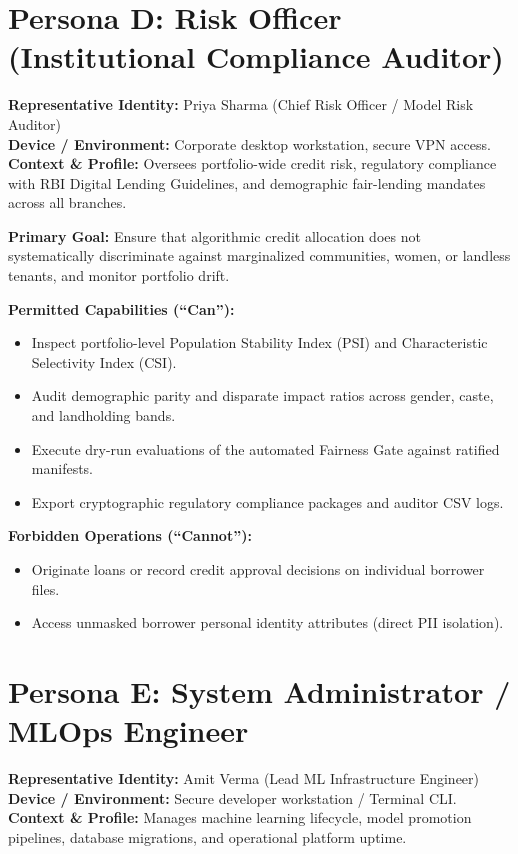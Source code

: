 \documentclass[11pt,a4paper,oneside]{report}
\begin{document}
\section{Persona D: Risk Officer (Institutional Compliance Auditor)}
\noindent\textbf{Representative Identity:} Priya Sharma (Chief Risk Officer / Model Risk Auditor)\\
\textbf{Device / Environment:} Corporate desktop workstation, secure VPN access.\\
\textbf{Context \& Profile:} Oversees portfolio-wide credit risk, regulatory compliance with RBI Digital Lending Guidelines, and demographic fair-lending mandates across all branches.

\vspace{0.2cm}
\noindent\textbf{Primary Goal:} Ensure that algorithmic credit allocation does not systematically discriminate against marginalized communities, women, or landless tenants, and monitor portfolio drift.

\vspace{0.2cm}
\noindent\textbf{Permitted Capabilities (``Can''):}
\begin{itemize}[leftmargin=1.5em, itemsep=1pt]
  \item Inspect portfolio-level Population Stability Index (PSI) and Characteristic Selectivity Index (CSI).
  \item Audit demographic parity and disparate impact ratios across gender, caste, and landholding bands.
  \item Execute dry-run evaluations of the automated Fairness Gate against ratified manifests.
  \item Export cryptographic regulatory compliance packages and auditor CSV logs.
\end{itemize}

\noindent\textbf{Forbidden Operations (``Cannot''):}
\begin{itemize}[leftmargin=1.5em, itemsep=1pt]
  \item Originate loans or record credit approval decisions on individual borrower files.
  \item Access unmasked borrower personal identity attributes (direct PII isolation).
\end{itemize}

\section{Persona E: System Administrator / MLOps Engineer}
\noindent\textbf{Representative Identity:} Amit Verma (Lead ML Infrastructure Engineer)\\
\textbf{Device / Environment:} Secure developer workstation / Terminal CLI.\\
\textbf{Context \& Profile:} Manages machine learning lifecycle, model promotion pipelines, database migrations, and operational platform uptime.
\end{document}
